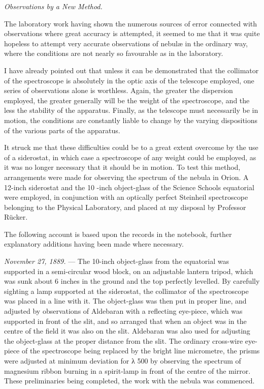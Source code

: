 \documentclass[a4paper, 12pt, oneside, polutonikogreek, english]{article}
\begin{document}
\emph{Observations by a New Method.}

The laboratory work having shown the numerous sources of error connected with observations where great accuracy is attempted, it seemed to me that it was quite hopeless to attempt very accurate observations of nebulæ in the ordinary way, where the conditions are not nearly so favourable as in the laboratory.

I have already pointed out that unless it can be demonstrated that the collimator of the spectroscope is absolutely in the optic axis of the telescope employed, one series of observations alone is worthless. Again, the greater the dispersion employed, the greater generally will be the weight of the spectroscope, and the less the stability of the apparatus. Finally, as the telescope must necessarily be in motion, the conditions are constantly liable to change by the varying dispositions of the various parts of the apparatus.

It struck me that these difficulties could be to a great extent overcome by the use of a siderostat, in which case a spectroscope of any weight could be employed, as it was no longer necessary that it should be in motion. To test this method, arrangements were made for observing the spectrum of the nebula in Orion. A 12-inch siderostat and the 10 -inch object-glass of the Science Schools equatorial were employed, in conjunction with an optically perfect Steinheil spectroscope belonging to the Physical Laboratory, and placed at my disposal by Professor Rücker.

The following account is based upon the records in the notebook, further explanatory additions having been made where necessary.

\emph{November 27, 1889.} --- The 10-inch object-glass from the equatorial was supported in a semi-circular wood block, on an adjustable lantern tripod, which was sunk about 6 inches in the ground and the top perfectly levelled. By carefully sighting a lamp supported at the siderostat, the collimator of the spectroscope was placed in a line with it. The object-glass was then put in proper line, and adjusted by observations of Aldebaran with a reflecting eye-piece, which was supported in front of the slit, and so arranged that when an object was in the centre of the field it was also on the slit. Aldebaran was also used for adjusting the object-glass at the proper distance from the slit. The ordinary cross-wire eye-piece of the spectroscope being replaced by the bright line micrometre, the prisms were adjusted at minimum deviation for λ 500 by observing the spectrum of magnesium ribbon burning in a spirit-lamp in front of the centre of the mirror. These preliminaries being completed, the work with the nebula was commenced.
\end{document}
